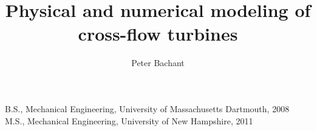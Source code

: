 
\title{Physical and numerical modeling of cross-flow turbines}

\author{Peter Bachant}

\prevdegrees
{
    B.S., Mechanical Engineering, University of Massachusetts Dartmouth, 2008
    \\
    M.S., Mechanical Engineering, University of New Hampshire, 2011
}





\thesisdate{\today}

\frontmatter

\maketitle
